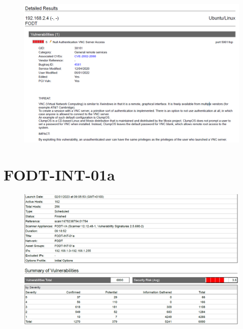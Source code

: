 \documentclass[target=bach,aauheader=]{thud}
\begin{document}
\pagebreak

\begin{figure}[h]
    \centering
    \includegraphics[width=1\linewidth]{images/FODT-INT-01_2.png}
    \caption{}
    \label{fig:fodt-int-01_2}
\end{figure}

\pagebreak

\section{FODT-INT-01a}

\begin{figure}[h]
    \centering
    \includegraphics[width=1\linewidth]{images/FODT-INT-01a_1.png}
    \caption{}
    \label{fig:fodt-int-01a_1}
\end{figure}

\pagebreak
\end{document}
